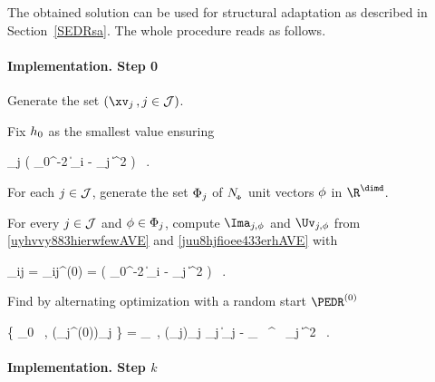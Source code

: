 The obtained solution can be used for structural adaptation as described in Section~\ref{SEDRsa}.
%
The whole procedure reads as follows. 


\paragraph{Implementation. Step 0}
\begin{mylist}
\item
Generate the set \( (\xv_{j} \, , j \in \JJJ) \).

\item
Fix \( h_{0} \) as the smallest value ensuring
\begin{EQA}[c]
	 \sum_{j \in \JJJ} 
	\sumi \Kern\bigl( \hiso_{0}^{-2} \| \Xv_{i} - \xv_{j} \|^{2} \bigr)
	\geq 
	\nmin
	\, .
\end{EQA}

\item
For each \( j \in \mathcal{J} \), generate the set \( \Phi_{j} \) of \( N_{_{\! \Phi}} \) unit vectors \( \phi \) in \( \R^{\dimd} \).

\item 
For every \( j \in \mathcal{J} \) and \( \phi \in \Phi_{j} \), compute \( \Ima_{j,\sph} \) and \( \Uv_{j,\sph} \) from 
\eqref{uyhvvy883hierwfewAVE} and \eqref{juu8hjfioee433erhAVE} 
with 
\begin{EQA}[c]
	\weight_{ij} 
	= 
	\weight_{ij}^{(0)}
	= 
	\Kern\bigl( \hiso_{0}^{-2} \| \Xv_{i} - \xv_{j} \|^{2} \bigr) 
	\, .
\end{EQA}
\item 
Find by alternating optimization with a random start \( \PEDR^{(0)} \)
\begin{EQA}[c]
	\{ \PEDR_{0} \, , (\fclv_{j}^{(0)})_{j \in \JJJ} \} 
	= 
	\arginf_{\PEDR \, , (\fclv_{j})_{j \in \JJJ}} 
	\sum_{j \in \JJJ} \bigl\| \Imav_{j} - \UV_{\jm} \, \PEDR^{\T} \, \fclv_{j} \bigr\|^{2}
	\, .
\end{EQA} 

\end{mylist}


\paragraph{Implementation. Step \( k \)}

